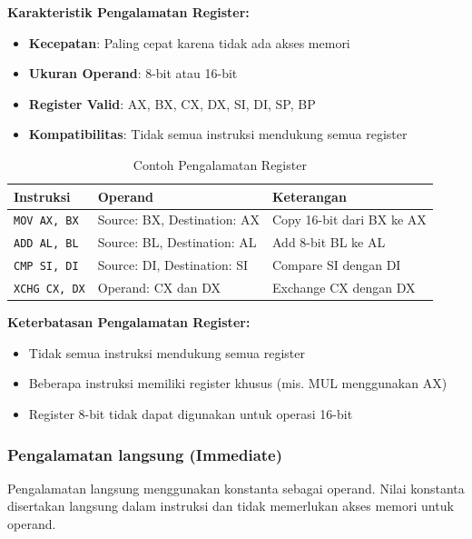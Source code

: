 \documentclass[../main.tex]{subfiles}
\begin{document}
\textbf{Karakteristik Pengalamatan Register:}
\begin{itemize}
    \item \textbf{Kecepatan}: Paling cepat karena tidak ada akses memori
    \item \textbf{Ukuran Operand}: 8-bit atau 16-bit
    \item \textbf{Register Valid}: AX, BX, CX, DX, SI, DI, SP, BP
    \item \textbf{Kompatibilitas}: Tidak semua instruksi mendukung semua register
\end{itemize}

\begin{table}[H]
    \centering
    \caption{Contoh Pengalamatan Register}
    \begin{tabular}{|p{3.5cm}|p{3.5cm}|p{6.5cm}|}
        \hline
        \textbf{Instruksi} & \textbf{Operand} & \textbf{Keterangan} \\
        \hline
        \texttt{MOV AX, BX} & Source: BX, Destination: AX & Copy 16-bit dari BX ke AX \\
        \hline
        \texttt{ADD AL, BL} & Source: BL, Destination: AL & Add 8-bit BL ke AL \\
        \hline
        \texttt{CMP SI, DI} & Source: DI, Destination: SI & Compare SI dengan DI \\
        \hline
        \texttt{XCHG CX, DX} & Operand: CX dan DX & Exchange CX dengan DX \\
        \hline
    \end{tabular}
    \label{tab:register-addressing-examples}
\end{table}

\textbf{Keterbatasan Pengalamatan Register:}
\begin{itemize}
    \item Tidak semua instruksi mendukung semua register
    \item Beberapa instruksi memiliki register khusus (mis. MUL menggunakan AX)
    \item Register 8-bit tidak dapat digunakan untuk operasi 16-bit
\end{itemize}

            \subsubsection{Pengalamatan langsung (Immediate)}
Pengalamatan langsung menggunakan konstanta sebagai operand. Nilai konstanta disertakan langsung dalam instruksi dan tidak memerlukan akses memori untuk operand.
\end{document}
